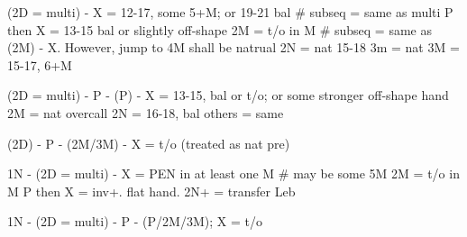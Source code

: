 (2D = multi) - 
X = 12-17, some 5+M; or 19-21 bal  # subseq = same as multi
P then X = 13-15 bal or slightly off-shape
2M = t/o in M  # subseq = same as (2M) - X. However, jump to 4M shall be natrual
2N = nat 15-18
3m = nat
3M = 15-17, 6+M

(2D = multi) - P - (P) -
X = 13-15, bal or t/o; or some stronger off-shape hand
2M = nat overcall
2N = 16-18, bal
others = same

(2D) - P - (2M/3M) - X = t/o (treated as nat pre)

1N - (2D = multi) - 
X = PEN in at least one M  # may be some 5M
2M = t/o in M
P then X = inv+. flat hand.
2N+ = transfer Leb

1N - (2D = multi) - P - (P/2M/3M); X = t/o